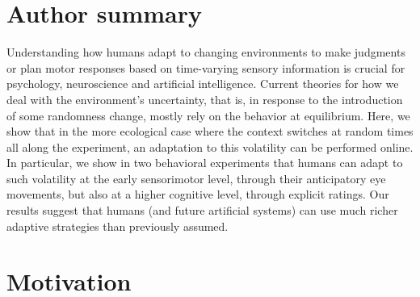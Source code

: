 \documentclass[10pt,letterpaper]{article}
\begin{document}
\section*{Author summary}
Understanding how humans adapt to changing environments to make judgments or plan motor responses based on time-varying sensory information is crucial for psychology, neuroscience and artificial intelligence. Current theories for how we deal with the environment's uncertainty, that is, in response to the introduction of some randomness change, mostly rely on the behavior at equilibrium. Here, we show that in the more ecological case where the context switches at random times all along the experiment, an adaptation to this volatility can be performed online. In particular, we show in two behavioral experiments that humans can adapt to such volatility at the early sensorimotor level, through their anticipatory eye movements, but also at a higher cognitive level, through explicit ratings. Our results suggest that humans (and future artificial systems) can use much richer adaptive strategies than previously assumed.
\section{Motivation}
\label{sec:intro}
\end{document}

